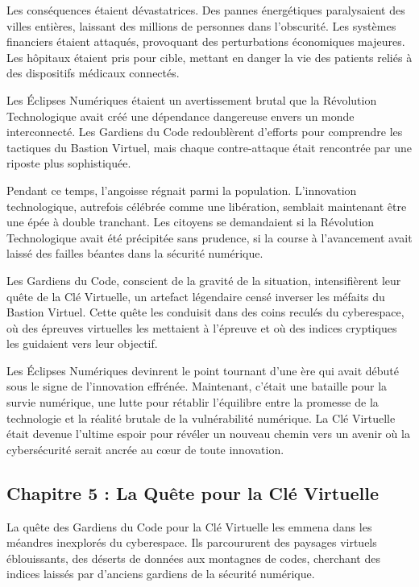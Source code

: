 \documentclass{./StyCls/MyArticle}
\begin{document}
Les conséquences étaient dévastatrices. Des pannes énergétiques paralysaient des villes entières, laissant des millions de personnes dans l'obscurité. Les systèmes financiers étaient attaqués, provoquant des perturbations économiques majeures. Les hôpitaux étaient pris pour cible, mettant en danger la vie des patients reliés à des dispositifs médicaux connectés.

Les Éclipses Numériques étaient un avertissement brutal que la Révolution Technologique avait créé une dépendance dangereuse envers un monde interconnecté. Les Gardiens du Code redoublèrent d'efforts pour comprendre les tactiques du Bastion Virtuel, mais chaque contre-attaque était rencontrée par une riposte plus sophistiquée.

Pendant ce temps, l'angoisse régnait parmi la population. L'innovation technologique, autrefois célébrée comme une libération, semblait maintenant être une épée à double tranchant. Les citoyens se demandaient si la Révolution Technologique avait été précipitée sans prudence, si la course à l'avancement avait laissé des failles béantes dans la sécurité numérique.

Les Gardiens du Code, conscient de la gravité de la situation, intensifièrent leur quête de la Clé Virtuelle, un artefact légendaire censé inverser les méfaits du Bastion Virtuel. Cette quête les conduisit dans des coins reculés du cyberespace, où des épreuves virtuelles les mettaient à l'épreuve et où des indices cryptiques les guidaient vers leur objectif.

Les Éclipses Numériques devinrent le point tournant d'une ère qui avait débuté sous le signe de l'innovation effrénée. Maintenant, c'était une bataille pour la survie numérique, une lutte pour rétablir l'équilibre entre la promesse de la technologie et la réalité brutale de la vulnérabilité numérique. La Clé Virtuelle était devenue l'ultime espoir pour révéler un nouveau chemin vers un avenir où la cybersécurité serait ancrée au cœur de toute innovation.

\subsection{Chapitre 5 : La Quête pour la Clé Virtuelle}


La quête des Gardiens du Code pour la Clé Virtuelle les emmena dans les méandres inexplorés du cyberespace. Ils parcoururent des paysages virtuels éblouissants, des déserts de données aux montagnes de codes, cherchant des indices laissés par d'anciens gardiens de la sécurité numérique.
\end{document}
